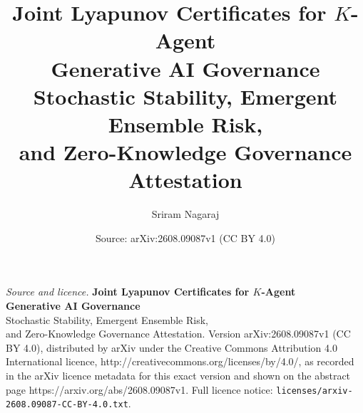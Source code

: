 \documentclass[10pt,a4paper]{amsart}
\title{\textbf{Joint Lyapunov Certificates for $K$-Agent\\ Generative AI Governance}\\[0.5em] \large Stochastic Stability, Emergent Ensemble Risk,\\ and Zero-Knowledge Governance Attestation}
\author{Sriram Nagaraj}
\date{Source: arXiv:2608.09087v1 (CC BY 4.0)}
\begin{document}
\maketitle

\noindent\emph{Source and licence.} \textbf{Joint Lyapunov Certificates for $K$-Agent\\ Generative AI Governance}\\[0.5em] \large Stochastic Stability, Emergent Ensemble Risk,\\ and Zero-Knowledge Governance Attestation. Version arXiv:2608.09087v1 (CC BY 4.0), distributed by arXiv under the Creative Commons Attribution 4.0 International licence, http://creativecommons.org/licenses/by/4.0/, as recorded in the arXiv licence metadata for this exact version and shown on the abstract page https://arxiv.org/abs/2608.09087v1. Full licence notice: \texttt{licenses/arxiv-2608.09087-CC-BY-4.0.txt}.\par\smallskip
\end{document}

